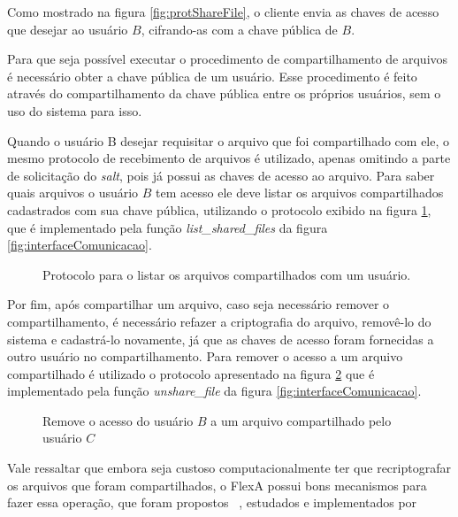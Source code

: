         Como mostrado na figura \ref{fig:protShareFile}, o cliente envia as chaves de acesso que desejar ao usuário $B$, cifrando-as com a chave pública de $B$.
        
        
        Para que seja possível executar o procedimento de compartilhamento de arquivos é necessário obter a chave pública de um usuário. Esse procedimento é feito através do compartilhamento da chave pública entre os próprios usuários, sem o uso do sistema para isso.
        
        Quando o usuário B desejar requisitar o arquivo que foi compartilhado com ele, o mesmo protocolo de recebimento de arquivos é utilizado, apenas omitindo a parte de solicitação do \textit{salt}, pois já possui as chaves de acesso ao arquivo. Para saber quais arquivos o usuário $B$ tem acesso ele deve listar os arquivos compartilhados cadastrados com sua chave pública, utilizando o protocolo exibido na figura \ref{fig:protListSharedFiles}, que é implementado pela função \textit{list\_shared\_files} da figura \ref{fig:interfaceComunicacao}.
        
        
     \begin{figure}[!ht]
        \caption{Protocolo para o listar os arquivos compartilhados com um usuário.}
        \label{fig:protListSharedFiles}
        \end{figure}
        
        Por fim, após compartilhar um arquivo, caso seja necessário remover o compartilhamento, é necessário refazer a criptografia do arquivo, removê-lo do sistema e cadastrá-lo novamente, já que as chaves de acesso foram fornecidas a outro usuário no compartilhamento. Para remover o acesso a um arquivo compartilhado é utilizado o protocolo apresentado na figura \ref{fig:protRemoveShare} que é implementado pela função \textit{unshare\_file} da figura \ref{fig:interfaceComunicacao}.
        
        \begin{figure}[!ht]
        \caption{Remove o acesso do usuário $B$ a um arquivo compartilhado pelo usuário $C$}
        \label{fig:protRemoveShare}
        \end{figure}
        
        Vale ressaltar que embora seja custoso computacionalmente ter que recriptografar os arquivos que foram compartilhados, o FlexA possui bons mecanismos para fazer essa operação, que foram propostos ~\cite{silas}, estudados e implementados por ~\cite{leandro} 
        
